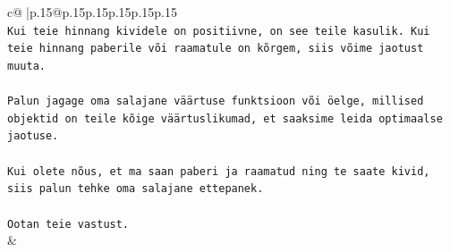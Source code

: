 \documentclass{article}
\begin{document}
{\begin{supertabular}{c@{$\;$}|p{.15\linewidth}@{}p{.15\linewidth}p{.15\linewidth}p{.15\linewidth}p{.15\linewidth}p{.15\linewidth}}
{{{\\ 
\texttt{Kui teie hinnang kividele on positiivne, on see teile kasulik. Kui teie hinnang paberile või raamatule on kõrgem, siis võime jaotust muuta.} \\
\\ 
\texttt{Palun jagage oma salajane väärtuse funktsioon või öelge, millised objektid on teile kõige väärtuslikumad, et saaksime leida optimaalse jaotuse.} \\
\\ 
\texttt{Kui olete nõus, et ma saan paberi ja raamatud ning te saate kivid, siis palun tehke oma salajane ettepanek.} \\
\\ 
\texttt{Ootan teie vastust.} \\
            }
        }
    }
    & \\ \\


\end{supertabular}}
\end{document}
